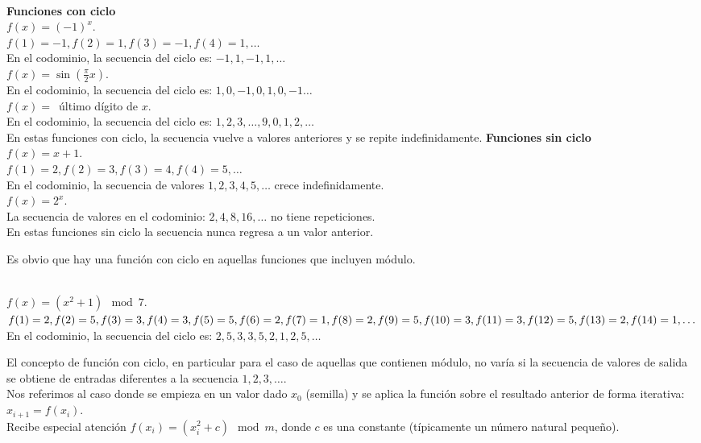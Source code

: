 \begin{ejemplo} \, \\
\textbf{Funciones con ciclo} \\
$f(x) = (-1)^x$. \\
$f(1)=-1, f(2)=1, f(3)=-1, f(4)=1, \dots$ \\
En el codominio, la secuencia del ciclo es:  $-1, 1, -1, 1, \dots$ \\
$f(x) = \sin (\frac{\pi}{2}x)$. \\
En el codominio, la secuencia del ciclo es: $1,0,-1,0,1,0,-1\dots$ \\
$f(x) = \,$ último dígito de $x$. \\
En el codominio, la secuencia del ciclo es: $1,2,3,\dots,9,0,1,2,\dots$ \\
En estas funciones con ciclo, la secuencia vuelve a valores anteriores y se repite indefinidamente.
\textbf{Funciones sin ciclo} \\
$f(x) = x+1$. \\
$f(1)=2, f(2)=3, f(3)=4, f(4)=5, \dots$ \\
En el codominio, la secuencia de valores $1,2,3,4,5,\dots$ crece indefinidamente. \\
$f(x) = 2^x$. \\
La secuencia de valores en el codominio: $2,4,8,16,\dots$  no tiene repeticiones. \\
En estas funciones sin ciclo la secuencia nunca regresa a un valor anterior.
\end{ejemplo}

Es obvio que hay una función con ciclo en aquellas funciones que incluyen módulo.

\begin{ejemplo} \, \\
$f(x) = (x^2 + 1) \mod 7$. \\
$f(1)=2, f(2)=5, f(3)=3, f(4)=3, f(5)=5, f(6)=2, f(7)=1, \\
f(8)=2, f(9)=5, f(10)=3, f(11)=3, f(12)=5, f(13)=2, f(14)=1,  \dots$ \\
En el codominio, la secuencia del ciclo es:  $2, 5, 3, 3, 5, 2, 1, 2, 5, \dots$ 
\end{ejemplo}

El concepto de función con ciclo, en particular para el caso de aquellas que contienen módulo, no varía si la secuencia de valores de salida se obtiene de entradas diferentes a la secuencia $1,2,3, \dots$. \\
Nos referimos al caso donde se empieza en un valor dado $x_0$ (semilla) y se aplica la función sobre el resultado anterior de forma iterativa: $x_{i+1} = f(x_i)$. \\
Recibe especial atención $f(x_i) = (x_i^2 + c) \mod m$, donde $c$ es una constante (típicamente un número natural pequeño).

